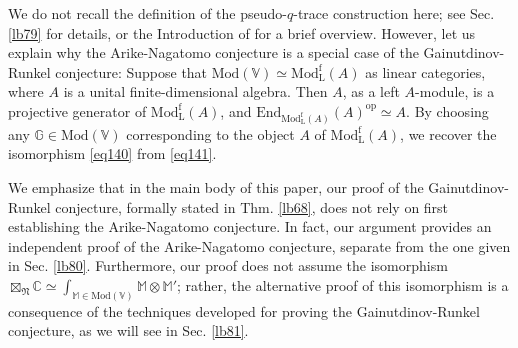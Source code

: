 \documentclass[11pt,b5paper,notitlepage]{article}
\theoremstyle{definition}
\theoremstyle{plain}
\newcommand{\End}{\mathrm{End}} %
\newcommand{\opp}{\mathrm{op}}
\newcommand{\Vbb}{\mathbb V}
\newcommand{\Mbb}{\mathbb M}
\newcommand{\Gbb}{\mathbb G}
\newcommand{\Cbb}{\mathbb C}
\newcommand{\<}{\left\langle}
\renewcommand{\>}{\right\rangle}
\newcommand{\Mod}{\mathrm{Mod}}
\newcommand{\ModfL}{\mathrm{Mod}^{\mathrm f}_{\mathrm L}}
\newcommand{\fn}{\mathfrak{N}}
\numberwithin{equation}{section}
\begin{document}
We do not recall the definition of the pseudo-$q$-trace construction here; see Sec. \ref{lb79} for details, or the Introduction of \cite{GZ4} for a brief overview. However, let us explain why the Arike-Nagatomo conjecture is a special case of the Gainutdinov-Runkel conjecture: Suppose that $\Mod(\Vbb)\simeq\ModfL(A)$ as linear categories, where $A$ is a unital finite-dimensional algebra. Then $A$, as a left $A$-module, is a projective generator of $\ModfL(A)$, and $\End_{\ModfL(A)}(A)^\opp\simeq A$. By choosing any $\Gbb\in\Mod(\Vbb)$ corresponding to the object $A$ of $\ModfL(A)$, we recover the isomorphism \eqref{eq140} from \eqref{eq141}.


We emphasize that in the main body of this paper, our proof of the Gainutdinov-Runkel conjecture, formally stated in Thm. \ref{lb68}, does not rely on first establishing the Arike-Nagatomo conjecture. In fact, our argument provides an independent proof of the Arike-Nagatomo conjecture, separate from the one given in Sec. \ref{lb80}. Furthermore, our proof does not assume the isomorphism $\boxtimes_\fn\Cbb\simeq\int_{\Mbb\in\Mod(\Vbb)}\Mbb\otimes\Mbb'$; rather, the alternative proof of this isomorphism is a consequence of the techniques developed for proving the Gainutdinov-Runkel conjecture, as we will see in Sec. \ref{lb81}.
\end{document}
